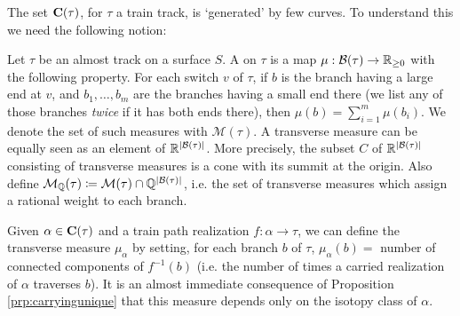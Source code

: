 The set $\mathbf C(\tau)$, for $\tau$ a train track, is `generated' by few curves. To understand this we need the following notion:
\begin{defin}\label{def:transversemeasure}
Let $\tau$ be an almost track on a surface $S$. A  on $\tau$ is a map $\mu:\mathcal B(\tau)\rightarrow \mathbb R_{\geq0}$ with the following property. For each switch $v$ of $\tau$, if $b$ is the branch having a large end at $v$, and $b_1,\ldots,b_m$ are the branches having a small end there (we list any of those branches \emph{twice} if it has both ends there), then $\mu(b)=\sum_{i=1}^m \mu(b_i)$. We denote the set of such measures with $\mathcal M(\tau)$. A transverse measure can be equally seen as an element of $\mathbb R^{|\mathcal B(\tau)|}$. More precisely, the subset $C$ of $\mathbb R^{|\mathcal B(\tau)|}$ consisting of transverse measures is a cone with its summit at the origin. Also define ${\mathcal M}_{\mathbb Q}(\tau)\coloneqq {\mathcal M}(\tau)\cap \mathbb Q^{|\mathcal B(\tau)|}$, i.e. the set of transverse measures which assign a rational weight to each branch.

Given $\alpha\in\mathbf C(\tau)$ and a train path realization $f:\alpha\rightarrow \tau$, we can define the transverse measure $\mu_\alpha$ by setting, for each branch $b$ of $\tau$, $\mu_\alpha(b)=$ number of connected components of $f^{-1}(b)$ (i.e. the number of times a carried realization of $\alpha$ traverses $b$). It is an almost immediate consequence of Proposition \ref{prp:carryingunique} that this measure depends only on the isotopy class of $\alpha$.
\end{defin}

